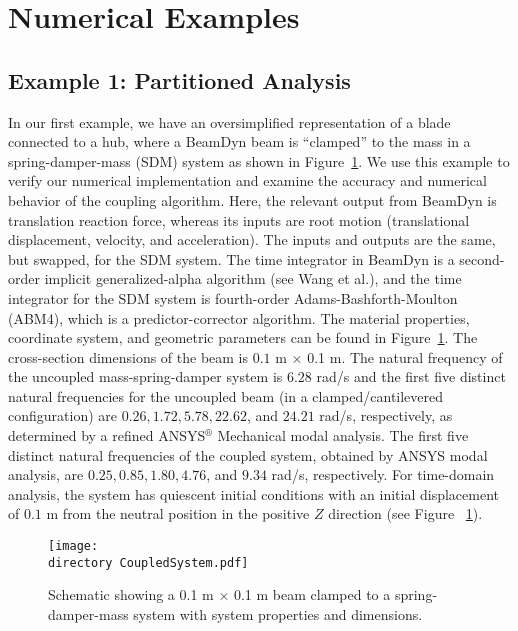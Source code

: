 \documentclass{aiaa-tc}
\def\directory{EPSF/}
\begin{document}
 
\section{Numerical Examples}
 
\subsection{Example 1: Partitioned Analysis}

In our first example, we have an oversimplified representation of a blade connected to a hub, where
a BeamDyn beam is ``clamped'' to the mass in a spring-damper-mass (SDM) system as shown in Figure~\ref{fig:CoupledSystem}.     
We use this example to verify our numerical implementation and examine the accuracy and numerical behavior of the coupling algorithm. 
Here, the relevant output from BeamDyn is translation reaction force, whereas its inputs are root motion (translational displacement, velocity, and acceleration).  
The inputs and outputs are the same, but swapped, for the SDM system.
The time integrator in BeamDyn is a second-order implicit generalized-alpha algorithm (see Wang et al.\cite{Wang-etal:2015}), and the time integrator for the SDM system is fourth-order Adams-Bashforth-Moulton (ABM4), which is a predictor-corrector algorithm.
The material properties, coordinate system, and geometric parameters can be found in Figure~\ref{fig:CoupledSystem}. 
The cross-section dimensions of the beam is $0.1$ m $\times$ 0.1 m. 
The natural frequency of the uncoupled mass-spring-damper system is $6.28$ rad/s and the first five distinct natural frequencies for the uncoupled beam (in a clamped/cantilevered configuration) are $0.26, 1.72, 5.78, 22.62$, and $24.21$ rad/s, respectively, as determined by a refined ANSYS$^{\circledR}$ Mechanical modal analysis. 
The first five distinct natural frequencies of the coupled system, obtained by ANSYS modal analysis, are $0.25, 0.85, 1.80, 4.76$, and $9.34$ rad/s, respectively.
For time-domain analysis, the system has quiescent initial conditions with an initial displacement of $0.1$ m from the neutral position in the positive $Z$ direction (see Figure ~\ref{fig:CoupledSystem}). 

\begin{figure}
\centering
\texttt{[image: \\directory CoupledSystem.pdf]}
\caption{Schematic showing a 0.1 m $\times$ 0.1 m beam clamped to a spring-damper-mass system with system properties and dimensions.} 
\label{fig:CoupledSystem}
\end{figure}
 
\end{document}

